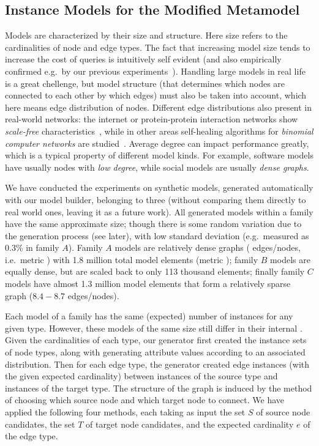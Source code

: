 \subsection{Instance Models for the Modified Metamodel}
\label{sec:benchmark-models}

Models are characterized by their size and structure. Here size refers to the cardinalities of node and edge types. The fact that increasing model size tends to increase the cost of queries is intuitively self evident (and also empirically confirmed e.g.\ by our previous experiments~\cite{icgt08-bhrv,models10}). Handling large models in real life is a great chellenge, but model structure (that determines which nodes are connected to each other by which edges) must also be taken into account, which here means edge distribution of nodes. Different edge distributions also present in real-world networks: the internet or protein-protein interaction networks show \emph{scale-free} characteristics~\cite{barabasi_network_2004}, while in other areas self-healing algorithms for \emph{binomial computer networks} are studied~\cite{binomial-self-healing}. Average degree can impact performance greatly, which is a typical property of different model kinds. For example, software models have usually nodes with \emph{low degree}, while social models are usually \emph{dense graphs}. 

We have conducted the experiments on synthetic models, generated automatically
with our model builder, belonging to three   (without
comparing them directly to real world ones, leaving it as a future work). All
generated models within a family have the same approximate size; though there is
some random variation due to the generation process (see later), with low
standard deviation (e.g.\ measured as 0.3\% in family $A$).  Family $A$ models are relatively dense graphs
( edges/nodes, i.e.\ metric ) with 1.8 million
total model elements (metric ); family $B$ models are equally
dense, but are scaled back to only 113 thousand elements; finally family $C$
models have almost 1.3 million model elements that form a relatively sparse
graph ($8.4-8.7$ edges/nodes).

Each model of a family has the same (expected) number of instances for any given
type. However, these models of the same size still differ in their internal
. Given the cardinalities of each type, our generator first
created the instance sets of node types, along with generating attribute values
according to an associated distribution. Then for each edge type, the generator
created edge instances (with the given expected cardinality) between instances
of the source type and instances of the target type. The structure of the graph
is induced by the method of choosing which source node and which target node to
connect. We have applied the following four methods, each taking as input the
set $S$ of source node candidates, the set $T$ of target node candidates, and
the expected cardinality $e$ of the edge type. %

